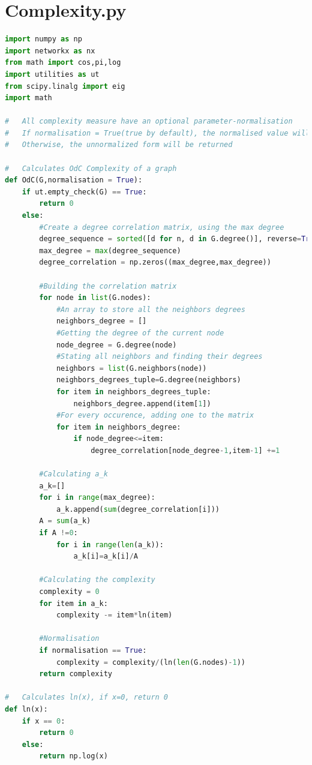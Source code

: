 \documentclass[12pt]{article}
\begin{document}
\section{Complexity.py}
\label{complexity_code}
\begin{lstlisting}[language=Python,breaklines=true]
import numpy as np
import networkx as nx
from math import cos,pi,log
import utilities as ut
from scipy.linalg import eig
import math

#   All complexity measure have an optional parameter-normalisation
#   If normalisation = True(true by default), the normalised value will be returned
#   Otherwise, the unnormalized form will be returned

#   Calculates OdC Complexity of a graph
def OdC(G,normalisation = True):
    if ut.empty_check(G) == True:
        return 0
    else:
        #Create a degree correlation matrix, using the max degree 
        degree_sequence = sorted([d for n, d in G.degree()], reverse=True)
        max_degree = max(degree_sequence)
        degree_correlation = np.zeros((max_degree,max_degree))
        
        #Building the correlation matrix
        for node in list(G.nodes):
            #An array to store all the neighbors degrees
            neighbors_degree = []
            #Getting the degree of the current node
            node_degree = G.degree(node)
            #Stating all neighbors and finding their degrees
            neighbors = list(G.neighbors(node))
            neighbors_degrees_tuple=G.degree(neighbors)
            for item in neighbors_degrees_tuple:
                neighbors_degree.append(item[1])
            #For every occurence, adding one to the matrix
            for item in neighbors_degree:
                if node_degree<=item:
                    degree_correlation[node_degree-1,item-1] +=1
                    
        #Calculating a_k
        a_k=[]
        for i in range(max_degree):
            a_k.append(sum(degree_correlation[i]))
        A = sum(a_k)
        if A !=0:
            for i in range(len(a_k)):
                a_k[i]=a_k[i]/A
        
        #Calculating the complexity
        complexity = 0
        for item in a_k:
            complexity -= item*ln(item)
        
        #Normalisation
        if normalisation == True:
            complexity = complexity/(ln(len(G.nodes)-1))
        return complexity

#   Calculates ln(x), if x=0, return 0
def ln(x):
    if x == 0:
        return 0
    else:
        return np.log(x)
    

\end{lstlisting}
\end{document}
